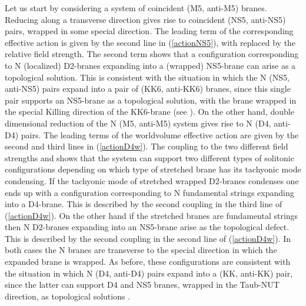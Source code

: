 \documentclass[12pt,a4paper]{article}
\begin{document}
Let us start by considering a system of coincident
(M5, anti-M5) branes. Reducing along a transverse direction gives rise
to coincident (NS5, anti-NS5) pairs, wrapped in some special direction.
The leading term of the corresponding effective action is given by
the second line in (\ref{actionNS5}), with \coordHE{} replaced 
by the relative field strength. The second term shows
that a configuration corresponding to
N (localized) D2-branes expanding into a (wrapped) NS5-brane can 
arise as a topological solution. This is consistent with
the situation in which the N (NS5, anti-NS5) pairs expand into a
pair of (KK6, anti-KK6) branes, since this single pair supports an
NS5-brane as a topological solution, with the brane wrapped in the
special Killing direction of the KK6-brane (see \cite{HL1}).
On the other hand, double dimensional reduction of the N (M5, anti-M5)
system gives rise to N (D4, anti-D4) pairs. The leading terms of the 
worldvolume effective action are given by the second and third lines
in (\ref{actionD4w}). The coupling to the two different field strengths
\coordHE{} and \coordHE{} shows that the system can
support two different types of solitonic configurations depending on
which type of stretched brane has its tachyonic mode condensing.
If the tachyonic mode
of stretched wrapped D2-branes condenses one ends up with a
configuration corresponding to 
N fundamental strings expanding into
a D4-brane. This is described by the second coupling in the third line of
(\ref{actionD4w}).
On the other hand if the stretched branes are fundamental strings
then N D2-branes expanding into an NS5-brane arise as the topological
defect. This is described by the second coupling in the second line of
(\ref{actionD4w}).
In both
cases the N branes are transverse to the special direction in which
the expanded brane is wrapped. As before, these configurations are
consistent with the situation in which N (D4, anti-D4) pairs
expand into a (KK, anti-KK) pair, since the latter
can support D4 and NS5 branes, wrapped in the Taub-NUT direction,
as topological solutions \cite{HL1}.
\end{document}
